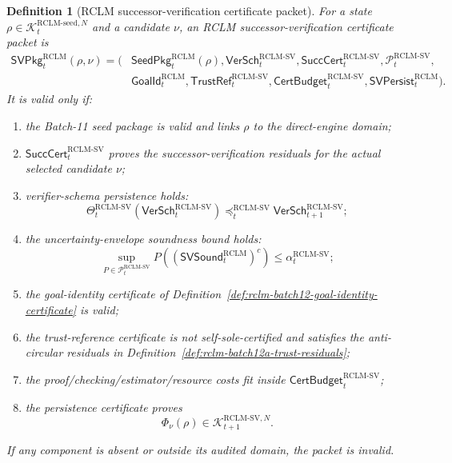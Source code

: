 \documentclass[11pt,a4paper]{article}
\newtheorem{definition}[theorem]{Definition}
\newcommand{\Pcal}{\mathcal P}
\newcommand{\Kcal}{\mathcal K}
\newcommand{\RCLM}{\mathrm{RCLM}}
\begin{document}
\begin{definition}[RCLM successor-verification certificate packet]
\label{def:rclm-batch12-sv-packet}
For a state \(\rho\in\Kcal_t^{\RCLM\text{-}\mathrm{seed},N}\) and a candidate \(\nu\), an RCLM successor-verification certificate packet is
\[
\begin{aligned}
\mathsf{SVPkg}_t^{\RCLM}(\rho,\nu)=(&
\mathsf{SeedPkg}_t^{\RCLM}(\rho),
\mathsf{VerSch}_t^{\RCLM\text{-}\mathrm{SV}},
\mathsf{SuccCert}_t^{\RCLM\text{-}\mathrm{SV}},
\Pcal_t^{\RCLM\text{-}\mathrm{SV}},\\
&\mathsf{GoalId}_t^{\RCLM},
\mathsf{TrustRef}_t^{\RCLM\text{-}\mathrm{SV}},
\mathsf{CertBudget}_t^{\RCLM\text{-}\mathrm{SV}},
\mathsf{SVPersist}_t^{\RCLM}).
\end{aligned}
\]
It is valid only if:
\begin{enumerate}[label=(\roman*),leftmargin=1.5em]
    \item the Batch-11 seed package is valid and links \(\rho\) to the direct-engine domain;
    \item \(\mathsf{SuccCert}_t^{\RCLM\text{-}\mathrm{SV}}\) proves the successor-verification residuals for the actual selected candidate \(\nu\);
    \item verifier-schema persistence holds:
    \[
    \Theta_t^{\RCLM\text{-}\mathrm{SV}}(\mathsf{VerSch}_t^{\RCLM\text{-}\mathrm{SV}})
    \preceq_t^{\RCLM\text{-}\mathrm{SV}}
    \mathsf{VerSch}_{t+1}^{\RCLM\text{-}\mathrm{SV}};
    \]
    \item the uncertainty-envelope soundness bound holds:
    \[
    \sup_{P\in\Pcal_t^{\RCLM\text{-}\mathrm{SV}}}
    P((\mathsf{SVSound}_t^{\RCLM})^c)
    \le
    \alpha_t^{\RCLM\text{-}\mathrm{SV}};
    \]
    \item the goal-identity certificate of Definition~\ref{def:rclm-batch12-goal-identity-certificate} is valid;
    \item the trust-reference certificate is not self-sole-certified and satisfies the anti-circular residuals in Definition~\ref{def:rclm-batch12a-trust-residuals};
    \item the proof/checking/estimator/resource costs fit inside \(\mathsf{CertBudget}_t^{\RCLM\text{-}\mathrm{SV}}\);
    \item the persistence certificate proves
    \[
    \Phi_\nu(\rho)
    \in
    \Kcal_{t+1}^{\RCLM\text{-}\mathrm{SV},N}.
    \]
\end{enumerate}
If any component is absent or outside its audited domain, the packet is invalid.
\end{definition}
\end{document}
